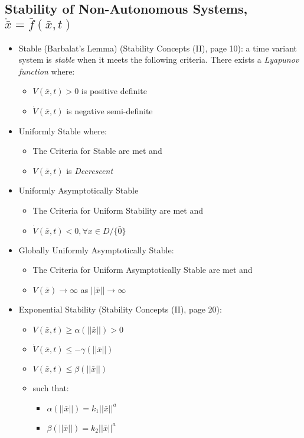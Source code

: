 \documentclass[12pt]{article}
\begin{document}
\newpage
\subsection*{Stability of Non-Autonomous Systems, $\dot{\bar{x}}=\bar{f}(\bar{x},t)$}
\begin{itemize}
\item Stable (Barbalat's Lemma) (Stability Concepts (II), page 10): a time variant system is {\em stable} when it meets the following criteria. There exists a {\em Lyapunov function} where:
	\begin{itemize}
	\item $V(\bar{x},t)>0$ is positive definite
	\item $\dot{V}(\bar{x},t)$ is negative semi-definite 
	\end{itemize}
\item Uniformly Stable where:
	\begin{itemize}
	\item The Criteria for Stable are met and
	\item $V(\bar{x},t)$ is {\em Decrescent}
	\end{itemize}
\item Uniformly Asymptotically Stable
	\begin{itemize}
	\item The Criteria for Uniform Stability are met and
	\item $\dot{V}(\bar{x},t)<0,\forall x \in D/\{\bar{0}\}$
	\end{itemize}
\item Globally Uniformly Asymptotically Stable:
	\begin{itemize}
	\item The Criteria for Uniform Asymptotically Stable are met and
	\item $V(\bar{x})\to\infty$ as $||\bar{x}||\to\infty$
	\end{itemize}
\item Exponential Stability (Stability Concepts (II), page 20):
	\begin{itemize}
	\item $V(\bar{x},t)\geq\alpha(||\bar{x}||)>0$
	\item $\dot{V}(\bar{x},t)\leq-\gamma(||\bar{x}||)$
	\item $V(\bar{x},t)\leq\beta(||\bar{x}||)$
	\item such that:
		\begin{itemize}
		\item $\alpha(||\bar{x}||)=k_1||\bar{x}||^a$
		\item $\beta(||\bar{x}||)=k_2||\bar{x}||^a$

\end{itemize}
\end{itemize}
\end{itemize}
\end{document}

